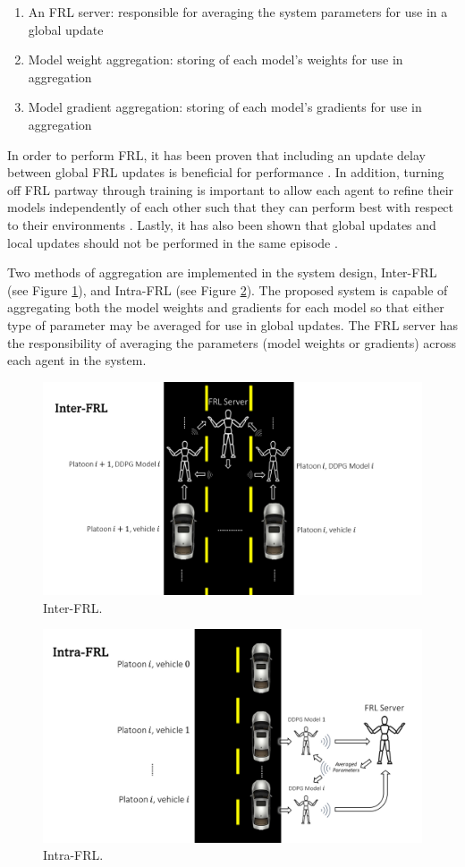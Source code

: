 \begin{enumerate}
    \item An FRL server: responsible for averaging the system parameters for use in a global update
    \item Model weight aggregation: storing of each model's weights for use in aggregation
    \item Model gradient aggregation: storing of each model's gradients for use in aggregation
\end{enumerate}

In order to perform FRL, it has been proven that including an update delay between global FRL updates is beneficial for performance \cite{Lim2020}. In addition, turning off FRL partway through training is important to allow each agent to refine their models independently of each other such that they can perform best with respect to their environments \cite{Lim2020}.  Lastly, it has also been shown that global updates and local updates should not be performed in the same episode \cite{Liang2019}.  

Two methods of aggregation are implemented in the system design, Inter-FRL (see Figure \ref{fig:interfrl}), and Intra-FRL (see Figure \ref{fig:intrafrl}).  The proposed system is capable of aggregating both the model weights and gradients for each model so that either type of parameter may be averaged for use in global updates.  The FRL server has the responsibility of averaging the parameters (model weights or gradients) across each agent in the system. 

\begin{figure}[H]
    \centering
    \includegraphics[width=0.69\linewidth]{assets/interfrl.PNG}
    \caption{Inter-FRL.}
    \label{fig:interfrl}
\end{figure}
\begin{figure}[H]
    \centering
    \includegraphics[width=0.69\linewidth]{assets/intrafrl.PNG}
    \caption{Intra-FRL.}
    \label{fig:intrafrl}
\end{figure}


